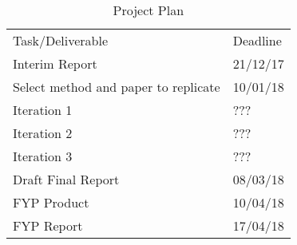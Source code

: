 \begin{table}[]
    \centering
    \caption{Project Plan}
    \label{pp}
    \begin{tabular}{ll}
        Task/Deliverable                     & Deadline \\
        Interim Report                       & 21/12/17 \\
        Select method and paper to replicate & 10/01/18 \\
        Iteration 1                          & ???      \\
        Iteration 2                          & ???      \\
        Iteration 3                          & ???      \\
        Draft Final Report                   & 08/03/18 \\
        FYP Product                          & 10/04/18 \\
        FYP Report                           & 17/04/18
    \end{tabular}
\end{table}
